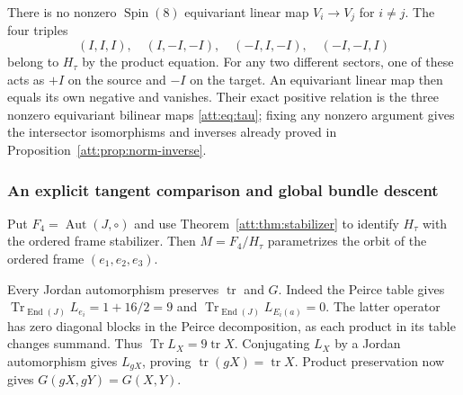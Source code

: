 \documentclass[11pt]{article}
\theoremstyle{definition}
\begin{document}
There is no nonzero $\operatorname{Spin}(8)$ equivariant linear map
$V_i\to V_j$ for $i\ne j$. The four triples
\[
 (I,I,I),\quad(I,-I,-I),\quad(-I,I,-I),\quad(-I,-I,I)
\]
belong to $H_\tau$ by the product equation. For any two different
sectors, one of these acts as $+I$ on the source and $-I$ on the
target. An equivariant linear map then equals its own negative and
vanishes. Their exact positive relation is the three nonzero
equivariant bilinear maps \eqref{att:eq:tau}; fixing any nonzero
argument gives the intersector isomorphisms and inverses already
proved in Proposition~\ref{att:prop:norm-inverse}.

\subsubsection{An explicit tangent comparison and global bundle descent}

Put $F_4=\operatorname{Aut}(J,\circ)$ and use
Theorem~\ref{att:thm:stabilizer} to identify $H_\tau$ with the ordered
frame stabilizer. Then $M=F_4/H_\tau$ parametrizes the orbit of the
ordered frame $(e_1,e_2,e_3)$.

Every Jordan automorphism preserves $\operatorname{tr}$ and $G$.
Indeed the Peirce table gives
$\operatorname{Tr}_{\operatorname{End}(J)}L_{e_i}=1+16/2=9$ and
$\operatorname{Tr}_{\operatorname{End}(J)}L_{E_i(a)}=0$.
The latter operator has zero diagonal blocks in the Peirce
decomposition, as each product in its table changes summand.
Thus $\operatorname{Tr}L_X=9\operatorname{tr}X$.
Conjugating $L_X$ by a Jordan automorphism gives $L_{gX}$, proving
$\operatorname{tr}(gX)=\operatorname{tr}X$. Product preservation now
gives $G(gX,gY)=G(X,Y)$.
\end{document}
